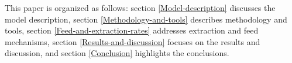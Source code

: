 This paper is organized as follows: section \ref{Model-description} discusses the model description, section \ref{Methodology-and-tools} describes methodology and tools, section \ref{Feed-and-extraction-rates} addresses extraction and feed mechanisms, section \ref{Results-and-discussion} focuses on the results and discussion, and section \ref{Conclusion} highlights the conclusions.